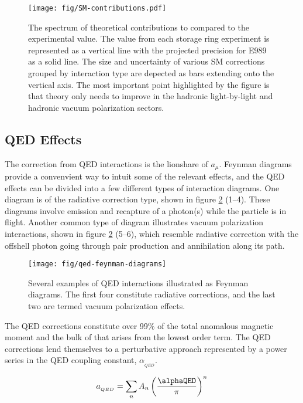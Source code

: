 \begin{figure}
\label{fig:sm-contributions}
\centering
\texttt{[image: fig/SM-contributions.pdf]}
\caption{The spectrum of theoretical contributions to \mugmtwo compared to the experimental value.  The value from each storage ring experiment is represented as a vertical line with the projected precision for E989 as a solid line.  The size and uncertainty of various SM corrections grouped by interaction type are depected as bars extending onto the vertical axis. The most important point highlighted by the figure is that theory only needs to improve in the hadronic light-by-light and hadronic vacuum polarization sectors.}
\end{figure}

\subsection{QED Effects} \label{s-sec:theory-qed}

The correction from QED interactions is the lionshare of $a_\mu$.  Feynman diagrams provide a convenvient way to intuit some of the relevant effects, and the QED effects can be divided into a few different types of interaction diagrams.  One diagram is of the radiative correction type, shown in figure \ref{fig:qed-feynman-diagrams} (1\hbox{--}4).  These diagrams involve emission and recapture of a photon(s) while the particle is in flight.  Another common type of diagram illustrates vacuum polarization interactions, shown in figure \ref{fig:qed-feynman-diagrams} (5\hbox{--}6), which resemble radiative correction with the offshell photon going through pair production and annihilation along its path.

\begin{figure}
\label{fig:qed-feynman-diagrams}
\centering
\texttt{[image: fig/qed-feynman-diagrams]}
\caption{Several examples of QED interactions illustrated as Feynman diagrams.  The first four constitute radiative corrections, and the last two are termed vacuum polarization effects. }
\end{figure}

The QED corrections constitute over 99\% of the total anomalous magnetic moment and the bulk of that arises from the lowest order term.  The QED corrections lend themselves to a perturbative approach represented by a power series in the QED coupling constant, $\alpha_{_{QED}}$.

\begin{equation}
\label{eqn:qed-correction-series}
a_{_{QED}} = \sum_n{A_n \left(\frac{\alphaQED}{\pi} \right)^n}
\end{equation}

